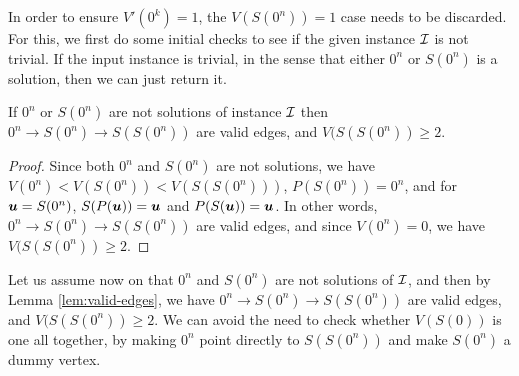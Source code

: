 %
In order to ensure $V'(0^k)=1$, the $V(S(0^n))=1$ case needs to be discarded. For
this, we first do some initial checks to see if the given instance $\mbox{${\mathcal I}$}$ is not
trivial.  If the input \EOPL instance is trivial, in the sense that either
$0^n$ or $S(0^n)$ is a solution, then we can just return it.

\begin{lemma}
\label{lem:valid-edges}
If $0^n$ or $S(0^n)$ are not solutions of \EOPL instance $\mbox{${\mathcal I}$}$ then $0^n
\rightarrow S(0^n) \rightarrow S(S(0^n))$ are valid edges, and $V(S(S(0^n))\ge 2$. 
\end{lemma}

\begin{proof}
Since both $0^n$ and $S(0^n)$ are not solutions, we have
	$V(0^n)<V(S(0^n))<V(S(S(0^n)))$, $P(S(0^n))=0^n$, and for $\mbox{\boldmath $u$} = S(0^n)$,
	$S(P(\mbox{\boldmath $u$}))=\mbox{\boldmath $u$}$ and $P(S(\mbox{\boldmath $u$}))=\mbox{\boldmath $u$}$. In other words, $0^n \rightarrow S(0^n)
	\rightarrow S(S(0^n))$ are valid edges, and since $V(0^n)=0$, we have
	$V(S(S(0^n))\ge 2$. 
\end{proof}

Let us assume now on that $0^n$ and $S(0^n)$ are not solutions of $\mbox{${\mathcal I}$}$, and
then by Lemma \ref{lem:valid-edges}, we have $0^n \rightarrow S(0^n) \rightarrow
S(S(0^n))$ are valid edges, and $V(S(S(0^n))\ge 2$. We can avoid the need to check
whether $V(S(0))$ is one all together, by making $0^n$ point directly to
$S(S(0^n))$ and make $S(0^n)$ a dummy vertex. 

